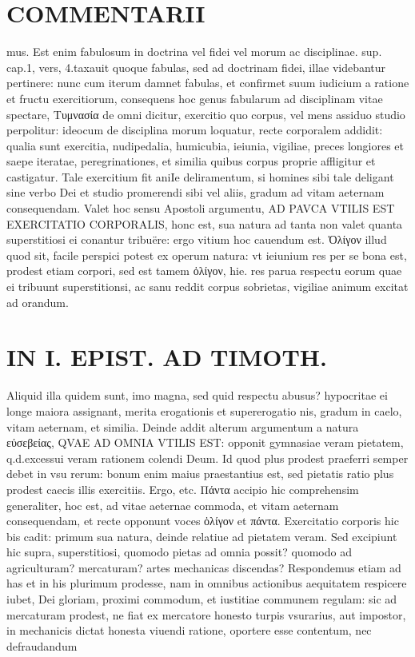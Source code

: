 \documentclass{article}
\begin{document}
\begin{pages}
\section*{COMMENTARII }
\marginpar{[ p.98 ]}\pstart mus. Est enim fabulosum in doctrina vel fidei vel morum ac disciplinae. sup. cap.1, vers, 4.taxauit quoque fabulas, sed ad doctrinam fidei, illae videbantur pertinere: nunc cum iterum damnet fabulas, et confirmet suum iudicium a ratione et fructu exercitiorum, consequens hoc genus fabularum ad disciplinam vitae spectare, Τυμνασία de omni dicitur, exercitio quo corpus, vel mens assiduo studio perpolitur: ideocum de disciplina morum loquatur, recte corporalem addidit: qualia sunt exercitia, nudipedalia, humicubia, ieiunia, vigiliae, preces longiores et saepe iteratae, peregrinationes, et similia quibus corpus proprie affligitur et castigatur. Tale exercitium fit aniIe deliramentum, si homines sibi tale deligant sine verbo Dei et studio promerendi sibi vel aliis, gradum ad vitam aeternam consequendam. Valet hoc sensu Apostoli argumentu, AD PAVCA VTILIS EST EXERCITATIO CORPORALIS, honc est, sua natura ad tanta non valet quanta superstitiosi ei conantur tribuëre: ergo vitium hoc cauendum est. Ὀλίγον illud quod sit, facile perspici potest ex operum natura: vt ieiunium res per se bona est, prodest etiam corpori, sed est tamem ὀλίγον, hie. res parua respectu eorum quae ei tribuunt superstitionsi, ac sanu reddit corpus sobrietas, vigiliae animum excitat ad orandum.  \pend
\section*{IN I. EPIST. AD TIMOTH. }
\marginpar{[ p.99 ]}\pstart Aliquid illa quidem sunt, imo magna, sed quid respectu abusus? hypocritae ei longe maiora assignant, merita erogationis et supererogatio nis, gradum in caelo, vitam aeternam, et similia.  \pend\pstart Deinde addit alterum argumentum a natura εὐσεβείας, QVAE AD OMNIA VTILIS EST: opponit gymnasiae veram pietatem, q.d.excessui veram rationem colendi Deum. Id quod plus prodest praeferri semper debet in vsu rerum: bonum enim maius praestantius est, sed pietatis ratio plus prodest caecis illis exercitiis. Ergo, etc.  \pend\pstart Πάντα accipio hic comprehensim generaliter, hoc est, ad vitae aeternae commoda, et vitam aeternam consequendam, et recte opponunt voces ὀλίγον et πάντα. Exercitatio corporis hic bis cadit: primum sua natura, deinde relatiue ad pietatem veram. Sed excipiunt hic supra, superstitiosi, quomodo pietas ad omnia possit? quomodo ad agriculturam? mercaturam? artes mechanicas discendas? Respondemus etiam ad has et in his plurimum prodesse, nam in omnibus actionibus aequitatem respicere iubet, Dei gloriam, proximi commodum, et iustitiae communem regulam: sic ad mercaturam prodest, ne fiat ex mercatore honesto turpis vsurarius, aut impostor, in mechanicis dictat honesta viuendi ratione, oportere esse contentum, nec defraudandum  \pend

\end{pages}
\end{document}

